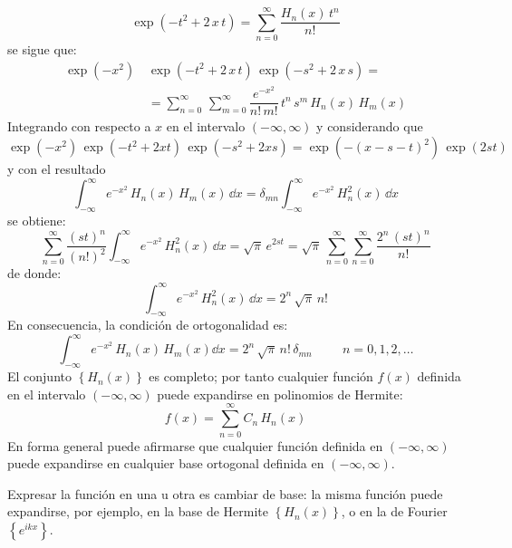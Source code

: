 \[ \exp \left( -t^{2} + 2 \, x \, t \right) = \sum_{n=0}^{\infty} \dfrac{H_{n} (x) \, t^{n}}{n!} \]
se sigue que:
\begin{align*}
\exp \left( -x^{2} \right) \, & \exp \left( -t^{2} + 2 \, x \, t \right) \, \exp \left( -s^{2} + 2 \, x \, s \right) = \\
&= \sum_{n=0}^{\infty} \, \sum_{m=0}^{\infty} \dfrac{e^{-x^{2}}}{n! \, m!} \, t^{n} \, s^{m} \, H_{n} (x) \, H_{m} (x)
\end{align*}
Integrando con respecto a $x$ en el intervalo $(-\infty, \infty)$ y considerando que
\[ \exp \left( -x^{2} \right) \, \exp \left( -t^{2} + 2 x t \right) \, \exp \left( -s^{2} + 2 x s \right) = \exp \left( - (x - s - t)^{2} \right) \, \exp \left( 2 s t \right) \]
y con el resultado
\[ \int_{-\infty}^{\infty} e^{-x^{2}} \, H_{n} (x) \, H_{m} (x) \, \dd x = \delta_{m n} \int_{-\infty}^{\infty} e^{-x^{2}} \, H_{n}^{2} (x) \, \dd x \]
se obtiene:
\[ \sum_{n=0}^{\infty} \dfrac{(s t)^{n}}{(n!)^{2}} \int_{-\infty}^{\infty} e^{-x^{2}} \, H_{n}^{2} (x) \, \dd x = \sqrt{\pi} \, e^{2 s t } = \sqrt{\pi} \, \sum_{n=0}^{\infty} \sum_{n=0}^{\infty} \dfrac{2^{n} \, (s t)^{n}}{n!} \]
de donde:
\[ \int_{-\infty}^{\infty} e^{-x^{2}} \, H_{n}^{2} (x) \, \dd x = 2^{n} \, \sqrt{\pi} \, n! \]
En consecuencia, la condición de ortogonalidad es:
\begin{equation}
\boxed{ \int_{-\infty}^{\infty} e^{-x^{2}} \, H_{n} (x) \, H_{m} (x) \dd x = 2^{n} \, \sqrt{\pi} \, n! \, \delta_{m n} \hspace{1cm} n = 0, 1, 2, \ldots }
\end{equation}
El conjunto $\left\{ H_{n }(x) \right\}$ es completo; por tanto cualquier función $f(x)$ definida en el intervalo $(-\infty, \infty)$ puede expandirse en polinomios de Hermite:
\[ f(x) = \sum_{n=0}^{\infty} C_{n} \, H_{n} (x) \]
En forma general puede afirmarse que cualquier función definida en $(-\infty, \infty)$ puede expandirse en cualquier base ortogonal definida en $(-\infty, \infty)$.
\par
Expresar la función en una u otra es cambiar de base: la misma función puede expandirse, por ejemplo, en la base de Hermite $\left\{ H_{n }(x) \right\}$, o en la de Fourier $\left\{ e^{i k x} \right\}$.
